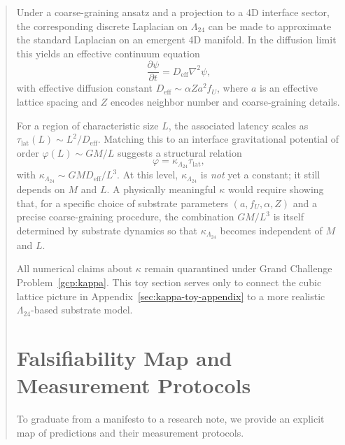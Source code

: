 \documentclass[11pt,titlepage]{article}
\newcommand{\leech}{\Lambda_{24}}
\begin{document}
\begin{abstract}
Under a coarse-graining ansatz and a projection to a 4D interface sector, the corresponding discrete Laplacian on $\leech$ can be made to approximate the standard Laplacian on an emergent 4D manifold. In the diffusion limit this yields an effective continuum equation
\begin{equation}
    \frac{\partial \psi}{\partial t} = D_{\mathrm{eff}} \nabla^2 \psi,
    \label{eq:effective-diffusion}
\end{equation}
with effective diffusion constant $D_{\mathrm{eff}} \sim \alpha Z a^2 f_U$, where $a$ is an effective lattice spacing and $Z$ encodes neighbor number and coarse-graining details.

For a region of characteristic size $L$, the associated latency scales as $\tau_{\mathrm{lat}}(L) \sim L^2 / D_{\mathrm{eff}}$. Matching this to an interface gravitational potential of order $\varphi(L) \sim GM/L$ suggests a structural relation
\begin{equation}
    \varphi = \kappa_{\leech} \tau_{\mathrm{lat}},
    \label{eq:kappa-leech-def}
\end{equation}
with $\kappa_{\leech} \sim GM D_{\mathrm{eff}} / L^3$. At this level, $\kappa_{\leech}$ is \emph{not} yet a constant; it still depends on $M$ and $L$. A physically meaningful $\kappa$ would require showing that, for a specific choice of substrate parameters $(a, f_U, \alpha, Z)$ and a precise coarse-graining procedure, the combination $GM/L^3$ is itself determined by substrate dynamics so that $\kappa_{\leech}$ becomes independent of $M$ and $L$.

All numerical claims about $\kappa$ remain quarantined under Grand Challenge Problem~\ref{gcp:kappa}. This toy section serves only to connect the cubic lattice picture in Appendix~\ref{sec:kappa-toy-appendix} to a more realistic $\leech$-based substrate model.


\section{Falsifiability Map and Measurement Protocols}
\label{sec:falsifiability}
To graduate from a manifesto to a research note, we provide an explicit map of predictions and their measurement protocols.


\end{abstract}
\end{document}
